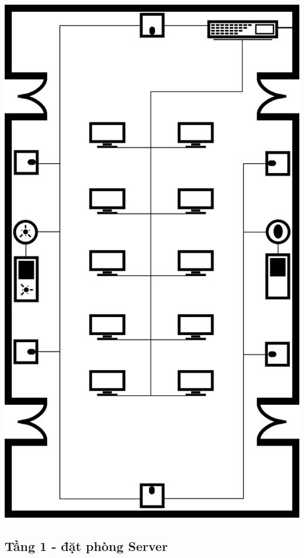 \documentclass[12pt]{report}
\begin{document}
			\begin{center}
				\includegraphics[scale=0.25]{roomMain.jpg} \\
			\end{center}
	
	\newpage
	\subsection{Tầng 1 - đặt phòng Server}
		
\end{document}
